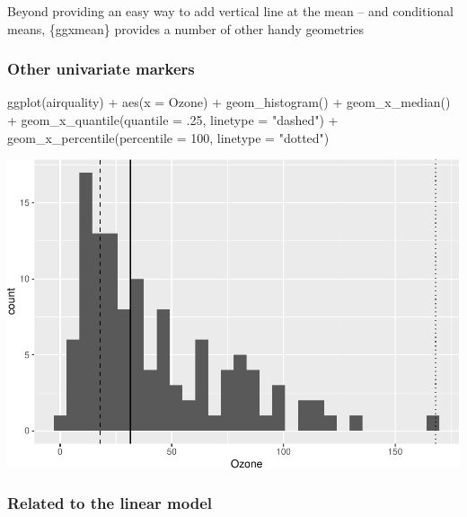\documentclass[12pt]{article}
\newenvironment{Shaded}{\begin{snugshade}}{\end{snugshade}}
\newcommand{\AttributeTok}[1]{\textcolor[rgb]{0.77,0.63,0.00}{#1}}
\newcommand{\DecValTok}[1]{\textcolor[rgb]{0.00,0.00,0.81}{#1}}
\newcommand{\FunctionTok}[1]{\textcolor[rgb]{0.00,0.00,0.00}{#1}}
\newcommand{\NormalTok}[1]{#1}
\newcommand{\SpecialCharTok}[1]{\textcolor[rgb]{0.00,0.00,0.00}{#1}}
\newcommand{\StringTok}[1]{\textcolor[rgb]{0.31,0.60,0.02}{#1}}
\begin{document}
Beyond providing an easy way to add vertical line at the mean -- and
conditional means, \{ggxmean\} provides a number of other handy
geometries

\hypertarget{other-univariate-markers}{%
\subsubsection{Other univariate
markers}\label{other-univariate-markers}}

\begin{Shaded}
\begin{Highlighting}[]
\FunctionTok{ggplot}\NormalTok{(airquality) }\SpecialCharTok{+} 
  \FunctionTok{aes}\NormalTok{(}\AttributeTok{x =}\NormalTok{ Ozone) }\SpecialCharTok{+} 
  \FunctionTok{geom\_histogram}\NormalTok{() }\SpecialCharTok{+} 
  \FunctionTok{geom\_x\_median}\NormalTok{() }\SpecialCharTok{+} 
  \FunctionTok{geom\_x\_quantile}\NormalTok{(}\AttributeTok{quantile =}\NormalTok{ .}\DecValTok{25}\NormalTok{,}
                  \AttributeTok{linetype =} \StringTok{"dashed"}\NormalTok{) }\SpecialCharTok{+} 
  \FunctionTok{geom\_x\_percentile}\NormalTok{(}\AttributeTok{percentile =} \DecValTok{100}\NormalTok{,}
                    \AttributeTok{linetype =} \StringTok{"dotted"}\NormalTok{)}
\end{Highlighting}
\end{Shaded}

\begin{center}\includegraphics[width=0.5\linewidth]{manuscript_files/figure-latex/unnamed-chunk-6-1} \end{center}

\hypertarget{related-to-the-linear-model}{%
\subsubsection{Related to the linear
model}\label{related-to-the-linear-model}}
\end{document}
